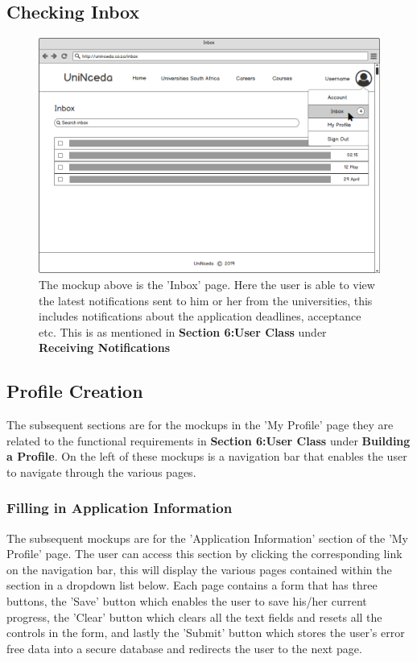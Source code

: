 \documentclass[a4paper, 12pt]{article}
\begin{document}
\subsection{Checking Inbox}

\renewcommand{\figurename}{Figure}
\setcounter{figure}{0}

\begin{figure}[H]
\centering
\includegraphics[scale=0.5]{Inbox}
\caption{The mockup above is the 'Inbox' page. Here the user is able to view the latest notifications sent to him or her from the universities, this includes notifications about the application deadlines, acceptance etc. This is as mentioned in \textbf{Section 6:User Class} under \textbf{Receiving Notifications}}
\label{Inbox}
\end{figure}

\newpage
\subsection{Profile Creation}
The subsequent sections are for the mockups in the 'My Profile' page they are related to the functional requirements in \textbf{Section 6:User Class} under \textbf{Building a Profile}. On the left of these mockups is a navigation bar that enables the user to navigate through the various pages.
\subsubsection{Filling in Application Information}
The subsequent mockups are for the 'Application Information' section of the 'My Profile' page. The user can access this section by clicking the corresponding link on the navigation bar, this will display the various pages contained within the section in a dropdown list below. Each page contains a form that has three buttons, the 'Save' button which enables the user to save his/her current progress, the 'Clear' button which clears all the text fields and resets all the controls in the form, and lastly the 'Submit' button which stores the user's error free data into a secure database and redirects the user to the next page.
\renewcommand{\figurename}{Step}
\setcounter{figure}{0}
\end{document}
